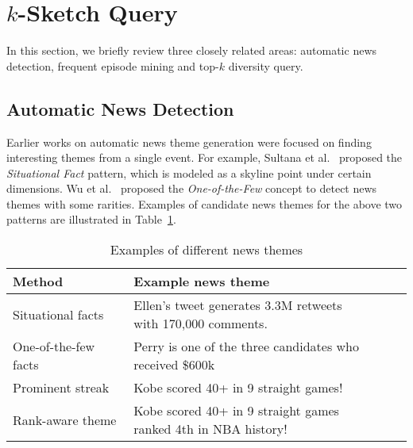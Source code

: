 \section{$k$-Sketch Query}\label{sec:related_work}
In this section, we briefly review three closely related areas: automatic news detection, frequent episode mining and top-$k$ diversity query.

\subsection{Automatic News Detection}
Earlier works on automatic news theme generation were focused on finding interesting themes from a single event. For example, Sultana et al.~\cite{sultana2014incremental} proposed the \emph{Situational Fact} pattern, which is modeled as a skyline point under certain dimensions. Wu et al.~\cite{wu2012one} proposed the \emph{One-of-the-Few} concept to detect news themes with some rarities. Examples of candidate news themes for the above two patterns are illustrated in Table~\ref{tbl:related_works}.

{\renewcommand{\arraystretch}{1.2} 
\begin{table}[h]
\centering
\begin{tabular}{|l|l|}
\hline
\textbf{Method} & \textbf{Example news theme}\\
\hline
Situational facts~\cite{sultana2014incremental} & \pbox{22cm}{\vspace{.3\baselineskip} Ellen's tweet generates 3.3M retweets\\ with 170,000 comments.\vspace{.3\baselineskip}} \\
\hline
One-of-the-few facts~\cite{wu2012one} & \pbox{22cm}{\vspace{.3\baselineskip}Perry is one of the three candidates \\  who received \$600k\vspace{.3\baselineskip}} \\
\hline
Prominent streak~\cite{zhang2014discovering} & Kobe scored 40+ in 9 straight games!  \\
\hline
Rank-aware theme & \pbox{22cm}{\vspace{.3\baselineskip}Kobe scored 40+ in 9 straight games\\ ranked 4th in NBA history!\vspace{.3\baselineskip}} \\
\hline
\end{tabular}
\caption{Examples of different news themes}
\label{tbl:related_works}
\end{table}
}

